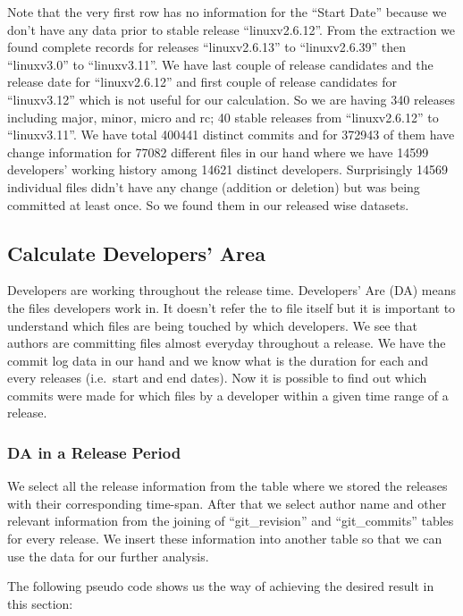 \documentclass{acm_proc_article-sp}
\begin{document}
Note that the very first row has no information for the ``Start Date'' because we don't have any data prior to stable release ``linuxv2.6.12''. From the extraction we found complete records for releases ``linuxv2.6.13'' to ``linuxv2.6.39'' then ``linuxv3.0'' to ``linuxv3.11''. We have last couple of release candidates and the release date for ``linuxv2.6.12'' and first couple of release candidates for ``linuxv3.12'' which is not useful for our calculation. So we are having 340 releases including major, minor, micro and rc; 40 stable releases from ``linuxv2.6.12'' to ``linuxv3.11''. We have total 400441 distinct commits and for 372943 of them have change information for 77082 different files in our hand where we have 14599 developers' working history among 14621 distinct developers.
Surprisingly 14569 individual files didn't have any change (addition or deletion) but was being committed at least once. So we found them in our released wise datasets.

\subsection{Calculate Developers' Area}
Developers are working throughout the release time. Developers' Are (DA) means the files developers work in. It doesn't refer the to file itself but it is important to understand which files are being touched by which developers. We see that authors are committing files almost everyday throughout a release. We have the commit log data in our hand and we know what is the duration for each and every releases (i.e.\ start and end dates). Now it is possible to find out which commits were made for which files by a developer within a given time range of a release.

\subsubsection{DA in a Release Period}
We select all the release information from the table where we stored the releases with their corresponding time-span. After that we select author name and other relevant information from the joining of ``git\_revision'' and ``git\_commits'' tables for every release. We insert these information into another table so that we can use the data for our further analysis.

The following pseudo code shows us the way of achieving the desired result in this section:
\end{document}

